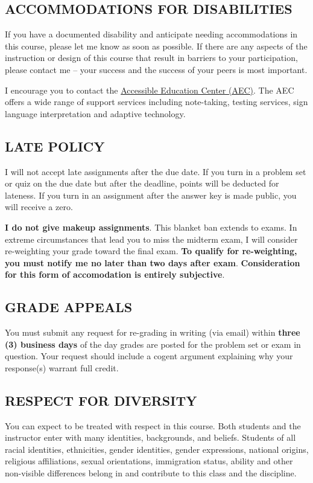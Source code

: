 \documentclass[11pt]{article}
\begin{document}
\subsection*{ACCOMMODATIONS FOR DISABILITIES}
If you have a documented disability and anticipate needing accommodations in this course, please let me know as soon as possible.
If there are any aspects of the instruction or design of this course that result in barriers to your participation, please contact me -- your success and the success of your peers is most important. 

I encourage you to contact the \href{https://aec.uoregon.edu/}{Accessible Education Center (AEC)}. The AEC offers a wide range of support services including note-taking, testing services, sign language interpretation and adaptive technology.

\subsection*{LATE POLICY}
I will not accept late assignments after the due date. 
If you turn in a problem set or quiz on the due date but after the deadline, points will be deducted for lateness. 
If you turn in an assignment after the answer key is made public, you will receive a zero. 

\textbf{I do not give makeup assignments}. 
This blanket ban extends to exams. 
In extreme circumstances that lead you to miss the midterm exam, I will consider re-weighting your grade toward the final exam. 
\textbf{To qualify for re-weighting, you must notify me no later than two days after exam}.
\textbf{Consideration for this form of accomodation is entirely subjective}. 

\subsection*{GRADE APPEALS}
You must submit any request for re-grading in writing (via email) within \textbf{three (3) business days} of the day grades are posted for the problem set or exam in question. 
Your request should include a cogent argument explaining why your response(s) warrant full credit. 

\subsection*{RESPECT FOR DIVERSITY}
You can expect to be treated with respect in this course.
Both students and the instructor enter with many identities, backgrounds, and beliefs.
Students of all racial identities, ethnicities, gender identities, gender expressions, national origins, religious affiliations, sexual orientations, immigration status, ability and other non-visible differences belong in and contribute to this class and the discipline.
\end{document}
